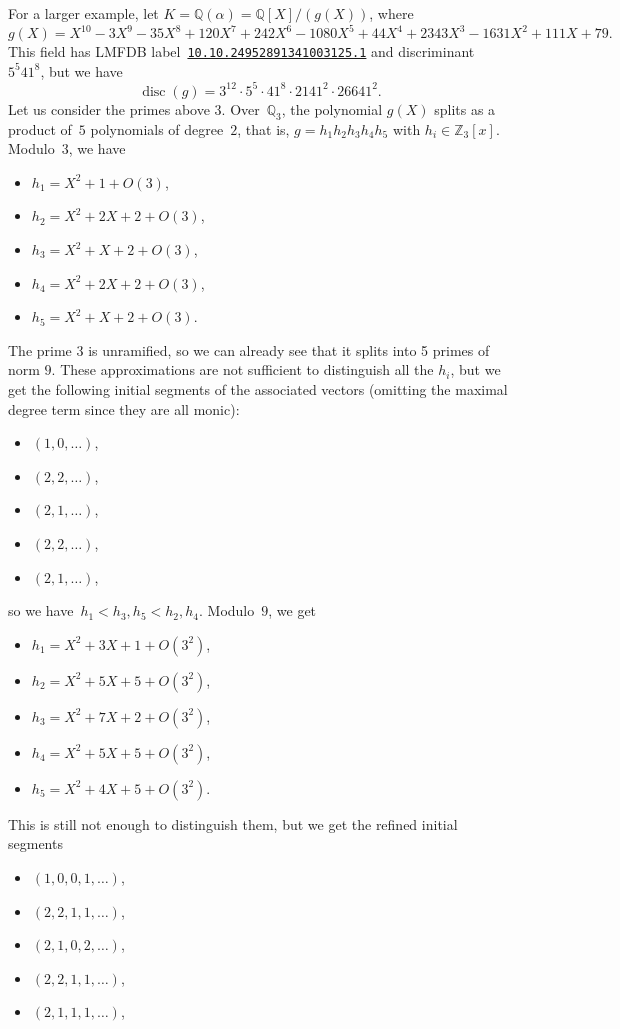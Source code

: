 \documentclass{article}
\def\Z{{\mathbb Z}}
\def\Q{{\mathbb Q}}
\DeclareMathOperator{\disc}{disc}
\begin{document}
For a larger example, let $K=\Q(\alpha)=\Q[X]/(g(X))$, where
\[
g(X)= X^{10} - 3X^9 - 35X^8 + 120X^7 + 242X^6 - 1080X^5 + 44X^4 + 2343X^3 -
1631X^2 + 111X + 79.
\]
This field has LMFDB
label~\href{http://beta.lmfdb.org/NumberField/10.10.24952891341003125.1}{\texttt{10.10.24952891341003125.1}} and discriminant~$5^5 41^8$, but we have
\[
\disc(g)=3^{12}\cdot 5^5\cdot 41^8\cdot 2141^2\cdot 26641^2.
\]
Let us consider the primes above $3$.
Over~$\Q_3$, the polynomial $g(X)$ splits as
a product of~$5$ polynomials of degree~$2$, that is, $g = h_1h_2h_3h_4h_5$ with
$h_i\in\Z_3[x]$. Modulo~$3$, we have
\begin{itemize}
  \item $h_1 = X^2 + 1 +O(3)$,
  \item $h_2 = X^2 + 2X + 2 + O(3)$,
  \item $h_3 = X^2 + X + 2 + O(3)$,
  \item $h_4 = X^2 + 2X + 2 + O(3)$,
  \item $h_5 = X^2 + X + 2 + O(3)$.
\end{itemize}
The prime $3$ is unramified, so we can already see that it splits into 5 primes of norm $9$.  These approximations are not sufficient to distinguish all the $h_i$,
but we get the following initial segments of the associated vectors (omitting
the maximal degree term since they are all monic):
\begin{itemize}
  \item $(1,0,\dots)$,
  \item $(2,2,\dots)$,
  \item $(2,1,\dots)$,
  \item $(2,2,\dots)$,
  \item $(2,1,\dots)$,
\end{itemize}
so we have~$h_1 < h_3,h_5 < h_2,h_4$. Modulo~$9$, we get
\begin{itemize}
  \item $h_1 = X^2 + 3X + 1 + O(3^2)$,
  \item $h_2 = X^2 + 5X + 5 + O(3^2)$,
  \item $h_3 = X^2 + 7X + 2 + O(3^2)$,
  \item $h_4 = X^2 + 5X + 5 + O(3^2)$,
  \item $h_5 = X^2 + 4X + 5 + O(3^2)$.
\end{itemize}
This is still not enough to distinguish them, but
we get the refined initial segments
\begin{itemize}
  \item $(1,0,0,1,\dots)$,
  \item $(2,2,1,1,\dots)$,
  \item $(2,1,0,2,\dots)$,
  \item $(2,2,1,1,\dots)$,
  \item $(2,1,1,1,\dots)$,
\end{itemize}
\end{document}
